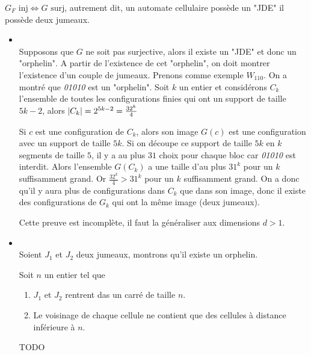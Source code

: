\begin{theorem}
	$G_F \text{ inj} \iff G \text{ surj}$, autrement dit, un automate cellulaire possède un "JDE" \ssi il possède deux jumeaux.
\end{theorem}



\begin{proofI}
	\begin{itemize}
		\item \bimpLR\\
		      Supposons que $G$ ne soit pas surjective, alors il existe un "JDE" et donc un "orphelin".
		      A partir de l'existence de cet "orphelin", on doit montrer l'existence d'un couple de jumeaux.
		      Prenons comme exemple $W_{110}$. On a montré que \emph{01010} est un "orphelin". Soit $k$ un entier
		      et considérons $C_k$ l'ensemble de toutes les configurations finies qui ont un support de taille
		      $5k-2$, alors $\left|C_k\right| = 2^{5k-2} = \frac {32^k} 4$

		      Si $c$ est une configuration de $C_k$, alors son image $G(c)$ est une configuration avec un support de taille $5k$.
		      Si on découpe ce support de taille $5k$ en $k$ segments de taille $5$, il y a au plus $31$ choix pour chaque bloc car
		      \emph{01010} est interdit. Alors l'ensemble $G(C_k)$ a une taille d'au plus $31^k$ pour un $k$ suffisamment grand.
		      Or $\frac {32^k} 4 > 31 ^ k$ pour un $k$ suffisamment grand. On a donc qu'il y aura plus de configurations
		      dans $C_k$ que dans son image, donc il existe des configurations de $G_k$ qui ont la même image (deux jumeaux).

		      Cette preuve est incomplète, il faut la généraliser aux dimensions $d > 1$.


		\item \bimpRL\\
		      Soient $J_1$ et $J_2$ deux jumeaux, montrons qu'il existe un orphelin.

		      Soit $n$ un entier tel que
		      \begin{enumerate}
			      \item $J_1$ et $J_2$ rentrent das un carré de taille $n$.
			      \item Le voisinage de chaque cellule ne contient que des cellules à distance inférieure à $n$.
		      \end{enumerate}
		      TODO
	\end{itemize}
\end{proofI}

